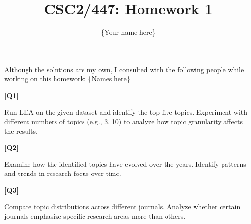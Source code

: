 \documentclass{article}
\title{CSC2/447: Homework 1}
\author{\{Your name here\}}
\date{}
\begin{document}
\maketitle
    Although the solutions are my own, I consulted with the following people while working on this homework: \{Names here\} \\

\vspace{3\baselineskip} 

\noindent \textbf{[Q1]}  

Run LDA on the given dataset and identify the top five topics. Experiment with different numbers of topics (e.g., 3, 10) to analyze how topic granularity affects the results.  


\vspace{3\baselineskip} 


\noindent \textbf{[Q2]}  

Examine how the identified topics have evolved over the years. Identify patterns and trends in research focus over time.  


\vspace{3\baselineskip} 


\noindent \textbf{[Q3]}  

Compare topic distributions across different journals. Analyze whether certain journals emphasize specific research areas more than others.  
\end{document}
